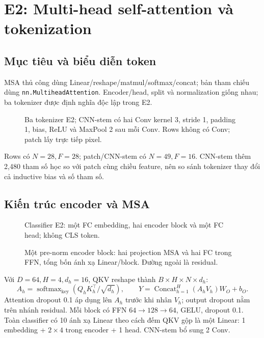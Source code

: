 \chapter{E2: Multi-head self-attention và tokenization}
\section{Mục tiêu và biểu diễn token}
MSA thủ công dùng Linear/reshape/matmul/softmax/concat; bản tham chiếu dùng
\texttt{nn.MultiheadAttention}. Encoder/head, split và normalization giống nhau;
ba tokenizer được định nghĩa độc lập trong E2.

\begin{figure}[H]\centering
\resizebox{.97\linewidth}{!}{\ArchTokens}
\caption{Ba tokenizer E2; CNN-stem có hai Conv kernel 3, stride 1, padding 1, bias, ReLU và MaxPool 2 sau mỗi Conv. Rows không có Conv; patch lấy trực tiếp pixel.}
\label{figure:e2-1}
\end{figure}
Rows có $ N=28,F=28$; patch/CNN-stem có $ N=49,F=16$.
CNN-stem thêm 2,480 tham số học so với patch cùng chiều feature, nên so sánh
tokenizer thay đổi cả inductive bias và số tham số.

\section{Kiến trúc encoder và MSA}
\begin{figure}[H]\centering
\resizebox{.97\linewidth}{!}{\ArchEncoder}
\caption{Classifier E2: một FC embedding, hai encoder block và một FC head; không CLS token.}
\label{figure:e2-2}
\end{figure}
\begin{figure}[H]\centering
\resizebox{.97\linewidth}{!}{\ArchMSA}
\caption{Một pre-norm encoder block: hai projection MSA và hai FC trong FFN, tổng bốn ánh xạ Linear/block. Đường ngoài là residual.}
\label{figure:e2-3}
\end{figure}
Với $ D=64,H=4,d_h=16$, QKV reshape thành $ B\times H\times N\times d_h $:
\begin{equation}
A_h=\operatorname{softmax}_{\mathrm{key}}\left(Q_hK_h^\top/\sqrt{d_h}\right),
\qquad Y=\operatorname{Concat}_{h=1}^{H}(A_hV_h)W_O+b_O.
\end{equation}
Attention dropout 0.1 áp dụng lên $ A_h $ trước khi nhân $ V_h $; output dropout
nằm trên nhánh residual. Mỗi block có FFN $64\to 128\to 64$, GELU,
dropout 0.1. Toàn classifier có 10 ánh xạ Linear theo cách đếm QKV gộp là
một Linear: 1 embedding + $2\times4$ trong encoder + 1 head. CNN-stem bổ sung 2 Conv.

